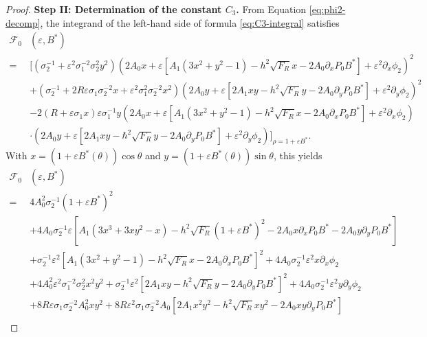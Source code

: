 \documentclass[12pt,reqno]{amsart}
\numberwithin{equation}{section}
\theoremstyle{definition}
\theoremstyle{remark}
\begin{document}
\begin{proof}
\textbf{Step II: Determination of the constant $ C_3 $.}
From Equation \eqref{eq:phi2-decomp}, the integrand of the left-hand side of formula \eqref{eq:C3-integral} satisfies
\begin{equation*}
	\begin{split}
\mathcal F_0&(\varepsilon,B^*)\\
=& \bigg[\left(\sigma_2^{-1}+\varepsilon^2 \sigma_1^{-2} \sigma_2^2 y^2\right)\left(2 A_0 x+\varepsilon\left[A_1\left(3 x^2+y^2-1\right)-h^2 \sqrt{F_R} x-2 A_0 \partial_x  P_0 B^*\right]+\varepsilon^2\partial_x \phi_2\right)^2 \\
	&	+  \left(\sigma_2^{-1}+2 R \varepsilon \sigma_1 \sigma_2^{-2} x+\varepsilon^2 \sigma_1^2 \sigma_2^{-2} x^2\right)\left(2 A_0 y+\varepsilon\left[2 A_1 x y-h^2 \sqrt{F_R} y-2 A_0 \partial_y  P_0 B^*\right]+\varepsilon^2 \partial_y \phi_2\right)^2 \\
	 &	-2\left(R+\varepsilon \sigma_1 x\right) \varepsilon \sigma_1^{-1} y \left(2 A_0 x+\varepsilon\left[A_1\left(3 x^2+y^2-1\right)-h^2 \sqrt{F_R} x-2 A_0 \partial_x  P_0 B^*\right]+\varepsilon^2 \partial_x \phi_2\right) \\
		&  \cdot\left(2 A_0 y+\varepsilon\left[2 A_1 x y-\hbar^2 \sqrt{F_R} y-2 A_0 \partial_y  P_0 B^*\right]+\varepsilon^2 \partial_y \phi_2\right) \bigg]_{\rho=1+ \varepsilon B^*}.
	\end{split}
\end{equation*} 
With  $x=(1+\varepsilon B^*(\theta))\cos\theta$ and $y=(1+\varepsilon B^*(\theta))\sin\theta$, this  yields 
\begin{equation}\label{eq:exp of F_0}
\begin{split}
\mathcal F_0&(\varepsilon,B^*)\\
=& 4 A_0^2 \sigma_2^{-1}\left(1+\varepsilon B^*\right)^2\\
&+4 A_0 \sigma_2^{-1} \varepsilon\left[A_1\left(3 x^3+3 x y^2-x\right)-h^2 \sqrt{F_R}\left(1+\varepsilon B^*\right)^2-2 A_0 x \partial_x P_0 B^*-2 A_0 y \partial_y  P_0 B^*\right] \\
& +\sigma_2^{-1} \varepsilon^2\left[A_1\left(3 x^2+y^2-1\right)-h^2 \sqrt{F_R} x-2 A_0 \partial_x P_0 B^*\right]^2+ 4 A_0 \sigma_2^{-1} \varepsilon^2 x \partial_x \phi_2 \\
&+4 A_0^2\varepsilon^2 \sigma_1^{-2} \sigma_2^2  x^2y^2   + \sigma_2^{-1} \varepsilon^2\left[2 A_1 x y-h^2 \sqrt{F_R} y-2 A_0 \partial_y P_0 B^*\right]^2+ 4 A_0 \sigma_2^{-1} \varepsilon^2 y \partial_y \phi_2  \\
&+ 8 R \varepsilon \sigma_1 \sigma_2^{-2} A_0^2 x y^2+ 8 R \varepsilon^2 \sigma_1 \sigma_2^{-2} A_0\left[2 A_1 x^2 y^2-h^2 \sqrt{F_R} x y^2-2 A_0 x y \partial_y  P_0 B^*\right] \\

\end{split}
\end{equation}
\end{proof}
\end{document}
